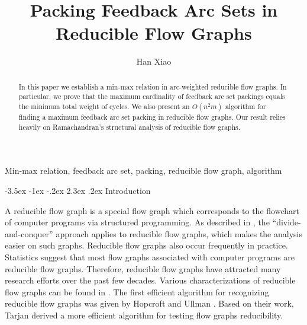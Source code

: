 \documentclass[11pt]{article}
\title{\bf Packing Feedback Arc Sets in Reducible Flow Graphs}
\author{Han Xiao}
\affil{Department of Mathematics, The University of Hong Kong,

Hong Kong, China

{\tt hxiao.math@connect.hku.hk}}
\makeatletter
\renewcommand\section{%
  \@startsection{section}{1}
                {\z@}%
                {-3.5ex \@plus -1ex \@minus -.2ex}%
                {2.3ex \@plus.2ex}%
                {\large\bfseries}%
}
\makeatother
\begin{document}
 \date{}
\maketitle

\begin{abstract}
In this paper we establish a min-max relation in arc-weighted reducible flow graphs. In particular, we prove that the maximum cardinality of feedback arc set packings equals the minimum total weight of cycles.  We also present an $O(n^2 m)$ algorithm for finding a maximum feedback arc set packing in reducible flow graphs. Our result relies heavily on Ramachandran's \cite{Rama1,Rama2} structural analysis of reducible flow graphs.
\end{abstract}

\quad Min-max relation, feedback arc set, packing, reducible flow graph, algorithm


\jot


\section{Introduction}
\label{intro}

A reducible flow graph is a special flow graph which corresponds to the flowchart of computer programs via structured programming. As described in \cite{Hech}, the ``divide-and-conquer'' approach applies to reducible flow graphs, which makes the analysis easier on such graphs. Reducible flow graphs also occur frequently in practice. Statistics suggest that most flow graphs associated with computer programs are reducible flow graphs. Therefore, reducible flow graphs have attracted many research efforts over the past few decades. Various characterizations of reducible flow graphs can be found in \cite{HecU1}. The first efficient algorithm for recognizing reducible flow graphs was given by Hopcroft and Ullman \cite{HopU}. Based on their work, Tarjan \cite{Tarj} derived a more efficient algorithm for testing flow graphs reducibility. 
\end{document}
